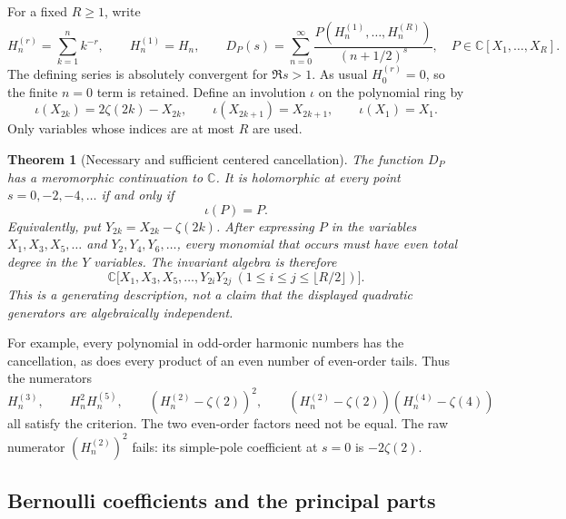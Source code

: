 \documentclass[11pt]{article}
\numberwithin{equation}{section}
\newtheorem{theorem}{Theorem}[section]
\theoremstyle{definition}
\theoremstyle{remark}
\begin{document}
For a fixed $R\ge1$, write
\[
 H_n^{(r)}=\sum_{k=1}^n k^{-r},\qquad H_n^{(1)}=H_n,
 \qquad
 D_P(s)=\sum_{n=0}^{\infty}
 \frac{P(H_n^{(1)},\ldots,H_n^{(R)})}{(n+1/2)^s},
 \quad P\in\mathbb C[X_1,\ldots,X_R].
\]
The defining series is absolutely convergent for $\Re s>1$.
As usual $H_0^{(r)}=0$, so the finite $n=0$ term is retained.
Define an involution $\iota$ on the polynomial ring by
\begin{equation}\label{hc:involution}
 \iota(X_{2k})=2\zeta(2k)-X_{2k},\qquad
 \iota(X_{2k+1})=X_{2k+1},\qquad \iota(X_1)=X_1.
\end{equation}
Only variables whose indices are at most $R$ are used.

\begin{theorem}[Necessary and sufficient centered cancellation]
\label{hc:main}
The function $D_P$ has a meromorphic continuation to $\mathbb C$.
It is holomorphic at every point $s=0,-2,-4,\ldots$ if and only if
\begin{equation}\label{hc:criterion}
                         \iota(P)=P.
\end{equation}
Equivalently, put $Y_{2k}=X_{2k}-\zeta(2k)$. After expressing $P$ in
the variables $X_1,X_3,X_5,\ldots$ and $Y_2,Y_4,Y_6,\ldots$, every
monomial that occurs must have even total degree in the $Y$ variables.
The invariant algebra is therefore
\begin{equation}\label{hc:invariant-ring}
 \mathbb C\bigl[X_1,X_3,X_5,\ldots,
        Y_{2i}Y_{2j}\ (1\le i\le j\le\lfloor R/2\rfloor)\bigr].
\end{equation}
This is a generating description, not a claim that the displayed
quadratic generators are algebraically independent.
\end{theorem}

For example, every polynomial in odd-order harmonic numbers has the
cancellation, as does every product of an even number of even-order
tails. Thus the numerators
\[
 H_n^{(3)},\qquad
 H_n^2H_n^{(5)},\qquad
 (H_n^{(2)}-\zeta(2))^2,\qquad
 (H_n^{(2)}-\zeta(2))(H_n^{(4)}-\zeta(4))
\]
all satisfy the criterion. The two even-order factors need not be equal.
The raw numerator $(H_n^{(2)})^2$ fails: its simple-pole coefficient
at $s=0$ is $-2\zeta(2)$.

\subsection{Bernoulli coefficients and the principal parts}
\end{document}
